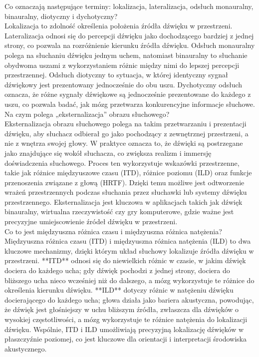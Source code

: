 \documentclass{article}
\begin{document}
Co oznaczają następujące terminy: lokalizacja, lateralizacja, odsłuch monauralny, binauralny, diotyczny i dychotyczny? \\
Lokalizacja to zdolność określenia położenia źródła dźwięku w przestrzeni. Lateralizacja odnosi się do percepcji dźwięku jako dochodzącego bardziej z jednej strony, co pozwala na rozróżnienie kierunku źródła dźwięku. Odsłuch monauralny polega na słuchaniu dźwięku jednym uchem, natomiast binauralny to słuchanie obydwoma uszami z wykorzystaniem różnic między nimi do lepszej percepcji przestrzennej. Odsłuch diotyczny to sytuacja, w której identyczny sygnał dźwiękowy jest prezentowany jednocześnie do obu uszu. Dychotyczny odsłuch oznacza, że różne sygnały dźwiękowe są jednocześnie prezentowane do każdego z uszu, co pozwala badać, jak mózg przetwarza konkurencyjne informacje słuchowe. \\
Na czym polega „eksternalizacja” obrazu słuchowego? \\
Eksternalizacja obrazu słuchowego polega na takim przetwarzaniu i prezentacji dźwięku, aby słuchacz odbierał go jako pochodzący z zewnętrznej przestrzeni, a nie z wnętrza swojej głowy. W praktyce oznacza to, że dźwięki są postrzegane jako znajdujące się wokół słuchacza, co zwiększa realizm i immersję doświadczenia słuchowego. Proces ten wykorzystuje wskazówki przestrzenne, takie jak różnice międzyuszowe czasu (ITD), różnice poziomu (ILD) oraz funkcje przenoszenia związane z głową (HRTF). Dzięki temu możliwe jest odtworzenie wrażeń przestrzennych podczas słuchania przez słuchawki lub systemy dźwięku przestrzennego. Eksternalizacja jest kluczowa w aplikacjach takich jak dźwięk binauralny, wirtualna rzeczywistość czy gry komputerowe, gdzie ważne jest precyzyjne umiejscowienie źródeł dźwięku w przestrzeni. \\
Co to jest międzyuszna różnica czasu i międzyuszna różnica natężenia? \\
Międzyuszna różnica czasu (ITD) i międzyuszna różnica natężenia (ILD) to dwa kluczowe mechanizmy, dzięki którym układ słuchowy lokalizuje źródła dźwięku w przestrzeni. **ITD** odnosi się do niewielkich różnic w czasie, w jakim dźwięk dociera do każdego ucha; gdy dźwięk pochodzi z jednej strony, dociera do bliższego ucha nieco wcześniej niż do dalszego, a mózg wykorzystuje te różnice do określenia kierunku dźwięku. **ILD** dotyczy różnic w natężeniu dźwięku docierającego do każdego ucha; głowa działa jako bariera akustyczna, powodując, że dźwięk jest głośniejszy w uchu bliższym źródła, zwłaszcza dla dźwięków o wysokiej częstotliwości, a mózg wykorzystuje te różnice natężenia do lokalizacji dźwięku. Wspólnie, ITD i ILD umożliwiają precyzyjną lokalizację dźwięków w płaszczyźnie poziomej, co jest kluczowe dla orientacji i interpretacji środowiska akustycznego. \\
\end{document}
